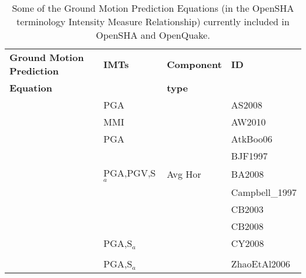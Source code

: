 \begin{table}[!t]
\centering
\begin{tabular}{llll} \hline
\textbf{Ground Motion Prediction} & \textbf{IMTs} & \textbf{Component } & \textbf{ID} \\
\textbf{Equation}& & \textbf{type} & \\ 
\hline
\cite{abrahamson2008} & PGA & & AS2008 \\
\cite{allen2010} & MMI & & AW2010 \\
\cite{atkinson2006} & PGA & & AtkBoo06 \\
\cite{boore1997} &  &  & BJF1997 \\
\cite{boore2008} & PGA,PGV,S$_{a}$ & Avg Hor & BA2008 \\
\cite{campbell1997} &  &  & Campbell\_1997 \\
\cite{campbell2003} &  &  & CB2003 \\
\cite{campbell2008} &  &  & CB2008 \\
\cite{chiou2008} & PGA,S$_{a}$ &  & CY2008 \\
\cite{field2000}  &  &  &  \\
\cite{zhao2006} & PGA,S$_{a}$ &  & ZhaoEtAl2006 \\
\hline
\end{tabular}
\caption{Some of the Ground Motion Prediction Equations (in the OpenSHA 
terminology Intensity Measure Relationship) currently included in OpenSHA 
and OpenQuake.}
\label{tab:OQ_GMPEs}
\end{table}
